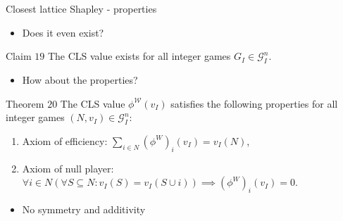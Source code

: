 \documentclass{beamer}
\begin{document}


\begin{frame}{Closest lattice Shapley - properties}
    \begin{itemize}
        \item Does it even exist?
    \end{itemize}

    \begin{block}{Claim $19$}
        The CLS value exists for all integer games $G_I \in \mathcal{G}_I^n$.
    \end{block}

    \begin{itemize}
        \item How about the properties?
    \end{itemize}

    \begin{block}{Theorem $20$}
        The CLS value $\phi^\mathcal{W}(v_I)$ satisfies the following properties for all integer games $(N,v_I) \in \mathcal{G}_I^n$:
        
        \begin{enumerate}
            \item Axiom of efficiency: $\sum_{i \in N}(\phi^W)_{i}(v_I) = v_I(N)$,
            \item Axiom of null player: $\forall i \in N(\forall S \subseteq N: v_I(S)=v_I(S \cup i)) \implies (\phi^W)_{i}(v_I) = 0$.
        \end{enumerate}
    \end{block}

    \begin{itemize}
        \item No symmetry and additivity
    \end{itemize}
\end{frame}


\end{document}
